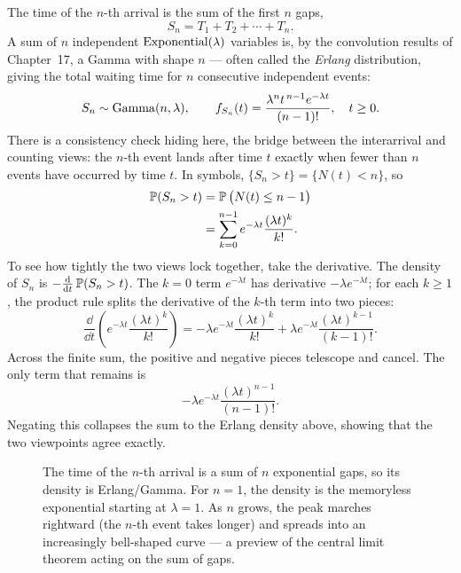 The time of the $n$-th arrival is the sum of the first $n$ gaps,
\[
S_n = T_1 + T_2 + \cdots + T_n.
\]
A sum of $n$ independent $\Expo(\lambda)$ variables is, by the convolution
results of Chapter~17, a Gamma with shape $n$ --- often called the \emph{Erlang}
distribution, giving the total waiting time for $n$ consecutive independent events:
\[
S_n \sim \Gam(n, \lambda), \qquad
f_{S_n}(t) = \frac{\lambda^n t^{\,n-1} e^{-\lambda t}}{(n-1)!}, \quad t \ge 0.
\]
There is a consistency check hiding here, the bridge between the interarrival and
counting views: the $n$-th event lands after time $t$ exactly when fewer than $n$
events have occurred by time $t$. In symbols,
$\{S_n > t\} = \{N(t) < n\}$, so
\begin{align*}
\P(S_n > t) &= \P\big(N(t) \le n-1\big) \\
&= \sum_{k=0}^{n-1} e^{-\lambda t}\frac{(\lambda t)^k}{k!}.
\end{align*}
To see how tightly the two views lock together, take the derivative. The density of
$S_n$ is $-\frac{\dd}{\dd t}\P(S_n > t)$. The $k = 0$ term $e^{-\lambda t}$ has derivative
$-\lambda e^{-\lambda t}$; for each $k \ge 1$, the product rule splits the derivative of the
$k$-th term into two pieces:
\[
\frac{\dd}{\dd t}\left( e^{-\lambda t}\frac{(\lambda t)^k}{k!} \right) = -\lambda e^{-\lambda t}\frac{(\lambda t)^k}{k!} + \lambda e^{-\lambda t}\frac{(\lambda t)^{k-1}}{(k-1)!}.
\]
Across the finite sum, the positive and negative pieces telescope and cancel.
The only term that remains is
\[
-\lambda e^{-\lambda t}\frac{(\lambda t)^{n-1}}{(n-1)!}.
\]
Negating this collapses the sum to the Erlang density above, showing that the two viewpoints
agree exactly.

\begin{figure}[H]
\centering
{}
\caption{The time of the $n$-th arrival is a sum of $n$ exponential gaps, so its
density is Erlang/Gamma. For $n=1$, the density is the memoryless exponential
starting at $\lambda = 1$. As $n$ grows, the peak marches rightward (the $n$-th event
takes longer) and spreads into an increasingly bell-shaped curve --- a preview of the
central limit theorem acting on the sum of gaps.}
\label{ch25:fig-erlang}
\end{figure}

